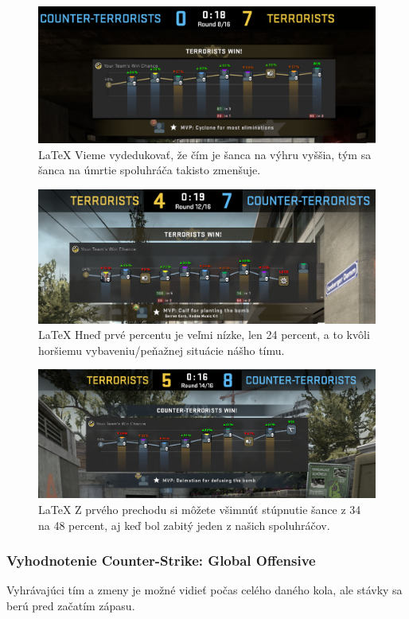   \begin{figure}
\includegraphics[width=.9\textwidth]{figures/sedemnula}
\centering
\caption{\LaTeX{} Vieme vydedukovať, že čím je šanca na výhru vyššia, tým sa šanca na úmrtie spoluhráča takisto zmenšuje. 
\label{sedemnula}}
\end{figure}
\begin{figure}
	\includegraphics[width=.9\textwidth]{figures/sedemstyri}
	\centering
	\caption{\LaTeX{} Hneď prvé percentu je veľmi nízke, len 24 percent, a to kvôli horšiemu vybaveniu/peňažnej situácie nášho tímu.
		\label{sedemstyri}}
\end{figure}
\begin{figure}
	\includegraphics[width=.9\textwidth]{figures/osempat}
	\centering
	\caption{\LaTeX{} Z prvého prechodu si môžete všimnúť stúpnutie šance z 34 na 48 percent, aj keď bol zabitý jeden z našich spoluhráčov. 
		\label{osempat}}
\end{figure}

 \subsubsection{Vyhodnotenie Counter-Strike: Global Offensive}
 Vyhrávajúci tím a zmeny je možné vidieť počas celého daného kola, ale stávky sa berú pred začatím zápasu.
 
